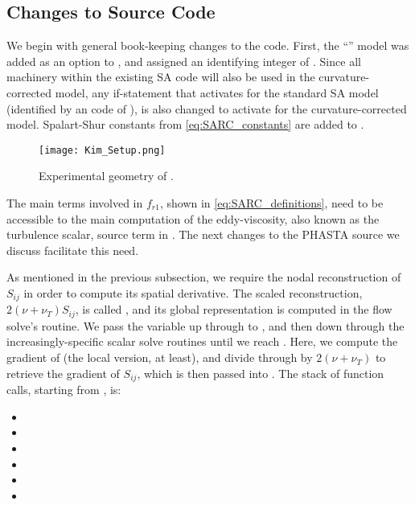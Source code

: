 \documentclass[11pt]{article}
\begin{document}
\subsection{Changes to Source Code}

We begin with general book-keeping changes to the code. First, the ``'' model was added as an option to , and assigned an identifying  integer of . Since all machinery within the existing SA code will also be used in the curvature-corrected model, any if-statement that activates for the standard SA model (identified by an  code of ), is also changed to activate for the curvature-corrected model. Spalart-Shur constants from \eqref{eq:SARC_constants} are added to .

\begin{wrapfigure}{r}{3.8in}
\centering
\texttt{[image: Kim\_Setup.png]}
\caption{Experimental geometry of \citet{kim1994}.}
\label{fig:setup_Kim}
\end{wrapfigure}

The main terms involved in $f_{r1}$, shown in \eqref{eq:SARC_definitions}, need to be accessible to the main computation of the eddy-viscosity, also known as the turbulence scalar, source term in . The next changes to the PHASTA source we discuss facilitate this need.

As mentioned in the previous subsection, we require the nodal reconstruction of $S_{ij}$ in order to compute its spatial derivative. The scaled reconstruction, $2 (\nu + \nu_T) S_{ij}$, is called , and its global representation is computed in the flow solve's  routine. We pass the variable up through  to , and then down through the increasingly-specific scalar solve routines until we reach . Here, we compute the gradient of  (the local version, at least), and divide through by $2(\nu + \nu_T)$ to retrieve the gradient of $S_{ij}$, which is then passed into . The stack of function calls, starting from , is:
\begin{itemize}
\item {}
\item {}
\item {}
\item {}
\item {}
\item {}
\end{itemize}
\end{document}
